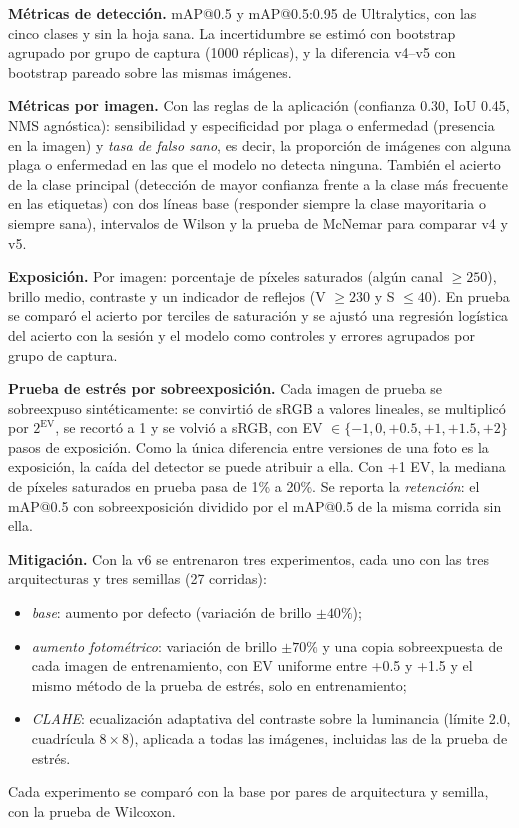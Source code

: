 \documentclass[sensors,article,submit,pdftex,moreauthors]{Definitions/mdpi}
\begin{document}
\textbf{Métricas de detección.} mAP@0.5 y mAP@0.5:0.95 de Ultralytics, con las cinco clases y sin la hoja sana. La incertidumbre se estimó con bootstrap agrupado por grupo de captura (1000 réplicas), y la diferencia v4--v5 con bootstrap pareado sobre las mismas imágenes.

\textbf{Métricas por imagen.} Con las reglas de la aplicación (confianza 0.30, IoU 0.45, NMS agnóstica): sensibilidad y especificidad por plaga o enfermedad (presencia en la imagen) y \emph{tasa de falso sano}, es decir, la proporción de imágenes con alguna plaga o enfermedad en las que el modelo no detecta ninguna. También el acierto de la clase principal (detección de mayor confianza frente a la clase más frecuente en las etiquetas) con dos líneas base (responder siempre la clase mayoritaria o siempre sana), intervalos de Wilson y la prueba de McNemar para comparar v4 y v5.

\textbf{Exposición.} Por imagen: porcentaje de píxeles saturados (algún canal $\geq 250$), brillo medio, contraste y un indicador de reflejos (V $\geq 230$ y S $\leq 40$). En prueba se comparó el acierto por terciles de saturación y se ajustó una regresión logística del acierto con la sesión y el modelo como controles y errores agrupados por grupo de captura.

\textbf{Prueba de estrés por sobreexposición.} Cada imagen de prueba se sobreexpuso sintéticamente: se convirtió de sRGB a valores lineales, se multiplicó por $2^{\mathrm{EV}}$, se recortó a 1 y se volvió a sRGB, con EV $\in \{-1, 0, +0.5, +1, +1.5, +2\}$ pasos de exposición. Como la única diferencia entre versiones de una foto es la exposición, la caída del detector se puede atribuir a ella. Con +1 EV, la mediana de píxeles saturados en prueba pasa de 1\% a 20\%. Se reporta la \emph{retención}: el mAP@0.5 con sobreexposición dividido por el mAP@0.5 de la misma corrida sin ella.

\textbf{Mitigación.} Con la v6 se entrenaron tres experimentos, cada uno con las tres arquitecturas y tres semillas (27 corridas):
\begin{itemize}[leftmargin=*,labelsep=4.9mm]
\item \emph{base}: aumento por defecto (variación de brillo $\pm 40\%$);
\item \emph{aumento fotométrico}: variación de brillo $\pm 70\%$ y una copia sobreexpuesta de cada imagen de entrenamiento, con EV uniforme entre +0.5 y +1.5 y el mismo método de la prueba de estrés, solo en entrenamiento;
\item \emph{CLAHE}: ecualización adaptativa del contraste sobre la luminancia (límite 2.0, cuadrícula $8\times8$), aplicada a todas las imágenes, incluidas las de la prueba de estrés.
\end{itemize}
Cada experimento se comparó con la base por pares de arquitectura y semilla, con la prueba de Wilcoxon.
\end{document}
